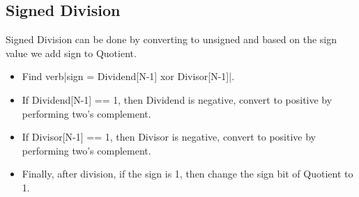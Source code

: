 \documentclass{article}
\begin{document}
\subsection{Signed Division}
Signed Division can be done by converting to unsigned and based on the sign value we add sign to Quotient.

\begin{itemize}
    \item Find verb|sign = Dividend[N-1] xor Divisor[N-1]|.
    \item If Dividend[N-1] == 1, then Dividend is negative, convert to positive by performing two's complement.
    \item If Divisor[N-1] == 1, then Divisor is negative, convert to positive by performing two's complement.
    \item Finally, after division, if the sign is 1, then change the sign bit of Quotient to 1.    
\end{itemize}
\end{document}
